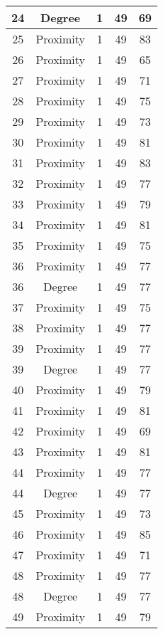 \documentclass[results.tex]{subfiles}
\begin{document}
\begin{center}
\begin{tabular}{| c || c | c | c | c |}
    \hline
    24 & Degree & 1 & 49 & 69 \\ 
    \hline
    25 & Proximity & 1 & 49 & 83 \\ 
    \hline
    26 & Proximity & 1 & 49 & 65 \\ 
    \hline
    27 & Proximity & 1 & 49 & 71 \\ 
    \hline
    28 & Proximity & 1 & 49 & 75 \\ 
    \hline
    29 & Proximity & 1 & 49 & 73 \\ 
    \hline
    30 & Proximity & 1 & 49 & 81 \\ 
    \hline
    31 & Proximity & 1 & 49 & 83 \\ 
    \hline
    32 & Proximity & 1 & 49 & 77 \\ 
    \hline
    33 & Proximity & 1 & 49 & 79 \\ 
    \hline
    34 & Proximity & 1 & 49 & 81 \\ 
    \hline
    35 & Proximity & 1 & 49 & 75 \\ 
    \hline
    36 & Proximity & 1 & 49 & 77 \\ 
    \hline
    36 & Degree & 1 & 49 & 77 \\ 
    \hline
    37 & Proximity & 1 & 49 & 75 \\ 
    \hline
    38 & Proximity & 1 & 49 & 77 \\ 
    \hline
    39 & Proximity & 1 & 49 & 77 \\ 
    \hline
    39 & Degree & 1 & 49 & 77 \\ 
    \hline
    40 & Proximity & 1 & 49 & 79 \\ 
    \hline
    41 & Proximity & 1 & 49 & 81 \\ 
    \hline
    42 & Proximity & 1 & 49 & 69 \\ 
    \hline
    43 & Proximity & 1 & 49 & 81 \\ 
    \hline
    44 & Proximity & 1 & 49 & 77 \\ 
    \hline
    44 & Degree & 1 & 49 & 77 \\ 
    \hline
    45 & Proximity & 1 & 49 & 73 \\ 
    \hline
    46 & Proximity & 1 & 49 & 85 \\ 
    \hline
    47 & Proximity & 1 & 49 & 71 \\ 
    \hline
    48 & Proximity & 1 & 49 & 77 \\ 
    \hline
    48 & Degree & 1 & 49 & 77 \\ 
    \hline
    49 & Proximity & 1 & 49 & 79 \\ 
    \hline   \end{tabular}
\end{center}
\end{document}
